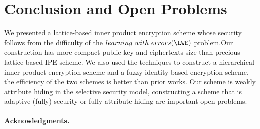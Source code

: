\section{Conclusion and Open Problems}  
We presented a lattice-based inner product encryption scheme whose security follows from the difficulty of the $learning~with~errors (\LWE)$ problem.Our construction has  more compact public key and ciphertexts size than precious lattice-based IPE scheme. We also used the techniques to construct a hierarchical inner product encryption scheme and a fuzzy identity-based encryption scheme, the efficiency of the two schemes is better than prior works. Our scheme is weakly attribute hiding in the selective security model, constructing a scheme that is adaptive (fully) security or fully attribute hiding are important open problems. 
\paragraph{Acknowledgments.}